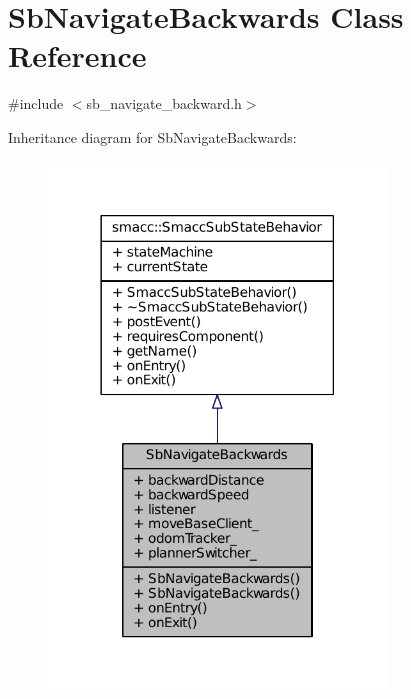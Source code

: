 \hypertarget{classSbNavigateBackwards}{}\section{Sb\+Navigate\+Backwards Class Reference}
\label{classSbNavigateBackwards}


{\ttfamily \#include $<$sb\+\_\+navigate\+\_\+backward.\+h$>$}



Inheritance diagram for Sb\+Navigate\+Backwards\+:
\nopagebreak
\begin{figure}[H]
\begin{center}
\leavevmode
\includegraphics[width=254pt]{classSbNavigateBackwards__inherit__graph}
\end{center}
\end{figure}


